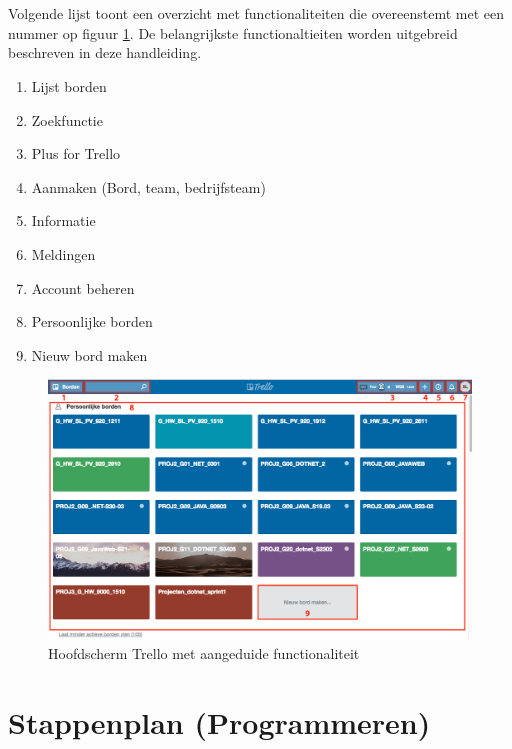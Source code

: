 \noindent
\\\\Volgende lijst toont een overzicht met functionaliteiten die overeenstemt met een nummer op figuur \ref{fig:overzicht_genummerd}. De belangrijkste functionaltieiten worden uitgebreid beschreven in deze handleiding.\\
\begin{enumerate}[nolistsep]
	\item Lijst borden
	\item Zoekfunctie
	\item Plus for Trello
	\item Aanmaken (Bord, team, bedrijfsteam) 
	\item Informatie
	\item Meldingen
	\item Account beheren
	\item Persoonlijke borden
	\item Nieuw bord maken
\end{enumerate}

\begin{figure}[!h]
	\centering
	\includegraphics[width=\textwidth]{./afbeeldingen/overzicht_genummerd.png}
	\caption{Hoofdscherm Trello met aangeduide functionaliteit}
	\label{fig:overzicht_genummerd}	
\end{figure} 

\section{Stappenplan (Programmeren)}

